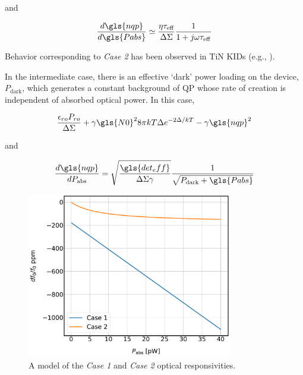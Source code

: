 and

\begin{equation}\label{eq:case2}
\frac{d\gls{nqp}}{d\gls{Pabs}} \simeq \frac{\eta\tau_{\mathrm{eff}}}{\Delta\Sigma}\frac{1}{1 + j\omega\tau_{\mathrm{eff}}}
\end{equation}

Behavior corresponding to \textit{Case 2} has been observed in TiN KIDs (e.g., \citet{catalano2014performance,hubmayr2015photon,hailey2016low}).

In the intermediate case, there is an effective `dark' power loading on the device, $P_{\mathrm{dark}}$, which generates a constant background of QP whose rate of creation is independent of absorbed optical power. In this case,

\begin{equation}
    \frac{\epsilon_{ro} P_{ro}}{\Delta \Sigma} + \gamma \gls{N0}^{2} 8\pi k T \Delta e^{-2 \Delta / kT} - \gamma\gls{nqp}^{2}
\end{equation}

and

\begin{equation}
  \frac{d\gls{nqp}}{dP_{\mathrm{abs}}} = \sqrt{\frac{\gls{det_eff}}{\Delta \Sigma \gamma}}\frac{1}{\sqrt{P_{\mathrm{dark}} + \gls{Pabs}}}
\end{equation}

\begin{figure}[!htbp]
\centering
\includegraphics[width=0.8\textwidth]{figures/kid_model/resp_case1_case2}
\caption[~A model of the case~1 and case~2 optical responsivities.]{A model of the \textit{Case 1} and \textit{Case 2} optical responsivities.}
\label{fig:responsivity}
\end{figure}


